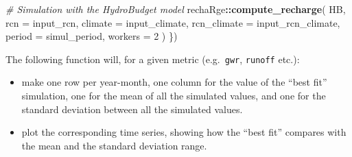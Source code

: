 \documentclass[
]{book}
\newenvironment{Shaded}{\begin{snugshade}}{\end{snugshade}}
\newcommand{\AttributeTok}[1]{\textcolor[rgb]{0.13,0.29,0.53}{#1}}
\newcommand{\CommentTok}[1]{\textcolor[rgb]{0.56,0.35,0.01}{\textit{#1}}}
\newcommand{\DecValTok}[1]{\textcolor[rgb]{0.00,0.00,0.81}{#1}}
\newcommand{\FunctionTok}[1]{\textcolor[rgb]{0.13,0.29,0.53}{\textbf{#1}}}
\newcommand{\NormalTok}[1]{#1}
\newcommand{\SpecialCharTok}[1]{\textcolor[rgb]{0.81,0.36,0.00}{\textbf{#1}}}
\providecommand{\tightlist}{%
  \setlength{\itemsep}{0pt}\setlength{\parskip}{0pt}}
\begin{document}
\begin{Shaded}
\begin{Highlighting}[]
  \CommentTok{\# Simulation with the HydroBudget model}
\NormalTok{  rechaRge}\SpecialCharTok{::}\FunctionTok{compute\_recharge}\NormalTok{(}
\NormalTok{    HB,}
    \AttributeTok{rcn =}\NormalTok{ input\_rcn,}
    \AttributeTok{climate =}\NormalTok{ input\_climate,}
    \AttributeTok{rcn\_climate =}\NormalTok{ input\_rcn\_climate,}
    \AttributeTok{period =}\NormalTok{ simul\_period,}
    \AttributeTok{workers =} \DecValTok{2}
\NormalTok{  )}
\NormalTok{\})}
\end{Highlighting}
\end{Shaded}

The following function will, for a given metric (e.g.~\texttt{gwr}, \texttt{runoff} etc.):

\begin{itemize}
\tightlist
\item
  make one row per year-month, one column for the value of the ``best fit'' simulation, one for the mean of all the simulated values, and one for the standard deviation between all the simulated values.
\item
  plot the corresponding time series, showing how the ``best fit'' compares with the mean and the standard deviation range.
\end{itemize}
\end{document}
